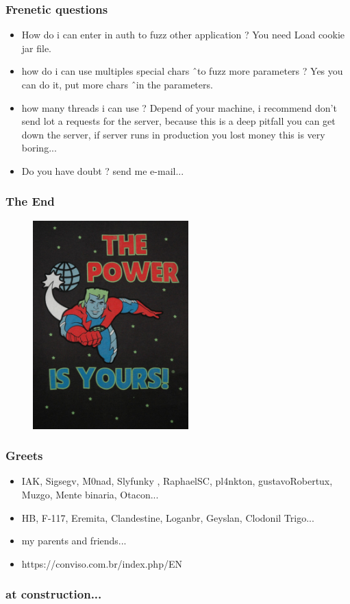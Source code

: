 \documentclass[serif,mathserif]{beamer}
\begin{document}
\begin{frame}
  \frametitle{Frenetic questions}
  \begin{itemize}
  \item How do i can enter in auth to fuzz other application ? You need Load cookie jar file.
  \item how do i can use multiples special chars \^ \ to fuzz more parameters ? Yes you can do it, put more chars \^ \ in the parameters.
  \item how many threads i can use ? Depend of your machine, i recommend don't send lot a requests for the server, because this is a deep pitfall you can get down the server, if server runs in production you lost money this is very boring...
  \item Do you have doubt ? send me e-mail...
  \end{itemize}
\end{frame}

\begin{frame}
  \frametitle{The End}
  \begin{figure}[]    
    \centering
    \includegraphics[width=6cm]{images/letsgoplanet.jpg} 
  \end{figure}
\end{frame}




\begin{frame}
  \frametitle{Greets}
  \begin{itemize}
  \item IAK, Sigsegv, M0nad, Slyfunky , RaphaelSC, pl4nkton, gustavoRobertux, Muzgo, Mente binaria, Otacon...
  \item HB, F-117, Eremita, Clandestine, Loganbr, Geyslan, Clodonil Trigo...
  \item my parents and friends...
  \item https://conviso.com.br/index.php/EN
  \end{itemize}
\end{frame}

\begin{frame}
  \frametitle{at construction...}
\end{frame}
\end{document}
